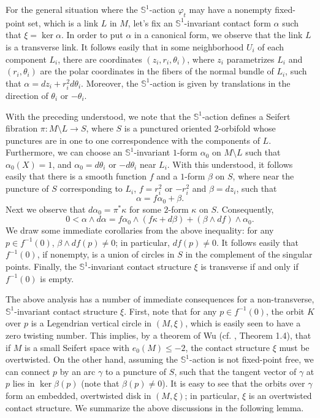 \documentclass[11pt]{amsart}
\theoremstyle{plain}
\numberwithin{theorem}{section}
\theoremstyle{definition}
\newcommand{\s}{{\mathbb S}}
\begin{document}
For the general situation where the $\s^1$-action $\varphi_t$ may have a nonempty fixed-point set, which is a link $L$ in $M$, let's fix an $\s^1$-invariant contact form $\alpha$ such that 
$\xi=\ker\alpha$. In order to put $\alpha$ in a canonical form, we observe that the link $L$ is a transverse link. It follows easily that in some neighborhood $U_i$ of each component $L_i$, there are coordinates $(z_i,r_i,\theta_i)$, where $z_i$ parametrizes $L_i$ and $(r_i,\theta_i)$ are the polar coordinates in the fibers of the normal bundle of $L_i$, such that $\alpha=dz_i+r_i^2d\theta_i$. Moreover, the $\s^1$-action is given by translations in the direction of $\theta_i$ or $-\theta_i$. 

With the preceding understood, we note that the $\s^1$-action defines a Seifert fibration $\pi: M\setminus L\rightarrow S$, where $S$ is a punctured oriented $2$-orbifold whose punctures are in one to one correspondence with the components of $L$. Furthermore, we can choose an $\s^1$-invariant $1$-form $\alpha_0$ on $M\setminus L$ such that 
$\alpha_0(X)=1$, and $\alpha_0=d\theta_i$ or $-d\theta_i$ near $L_i$. With this understood, it follows easily that there is a smooth function $f$ and a $1$-form $\beta$ on $S$, where near the puncture of $S$ corresponding to $L_i$, $f=r^2_i$ or $-r_i^2$ and $\beta=dz_i$, such that 
$$
\alpha=f\alpha_0+\beta.
$$
Next we observe that $d\alpha_0=\pi^\ast \kappa$ for some $2$-form $\kappa$
on $S$. Consequently, 
$$
0<\alpha\wedge d\alpha =f\alpha_0\wedge (f\kappa+d\beta)+(\beta\wedge df)\wedge \alpha_0.
$$
We draw some immediate corollaries from the above inequality: for any $p\in f^{-1}(0)$, 
$\beta\wedge df (p)\neq 0$; in particular, $df(p)\neq 0$. It follows 
easily that $f^{-1}(0)$, if nonempty, is a union of circles in $S$ in the complement of the 
singular points. Finally, the $\s^1$-invariant contact structure $\xi$ is transverse if and only if $f^{-1}(0)$ is empty.

The above analysis has a number of immediate consequences for a non-transverse, $\s^1$-invariant  contact structure $\xi$. First, note that for any $p\in  f^{-1}(0)$, the orbit $K$ over $p$ is a Legendrian vertical circle in $(M,\xi)$, which is easily seen to have a zero twisting number. This implies, by a theorem of Wu (cf. \cite{Wu}, Theorem 1.4), that if $M$ is a small Seifert space with $e_0(M)\leq -2$, the contact structure $\xi$ must be overtwisted. On the other hand, assuming the $\s^1$-action is not fixed-point free, we can connect $p$ by an arc $\gamma$ to a puncture of $S$, such that the tangent vector of $\gamma$ at $p$ lies in $\ker\beta(p)$ (note that $\beta(p)\neq 0$). It is easy to see that the orbits over $\gamma$ form an embedded, overtwisted disk in $(M,\xi)$; in particular, $\xi$ is an overtwisted contact structure. We summarize the above discussions in the following lemma.
\end{document}
